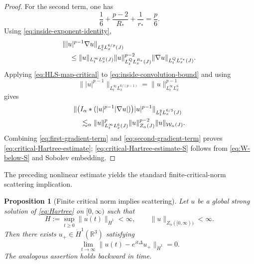 \documentclass[preprint,12pt]{elsarticle}
\numberwithin{equation}{section}
\newtheorem{proposition}[theorem]{Proposition}
\theoremstyle{remark}
\newcommand{\R}{\mathbb R}
\newcommand{\Znorm}{Z_{\alpha}}
\newcommand{\Wnorm}{\mathcal W_{\alpha}}
\begin{document}
\begin{proof}
For the second term, one has
\begin{equation}\label{eq:inside-exponent-identity}
  \frac16+\frac{p-2}{R_*}+\frac1{r_*}=\frac p6.
\end{equation}
Using \eqref{eq:inside-exponent-identity},
\begin{align}
 &\||u|^{p-1}\nabla u\|_{L_t^2L_x^{6/p}(J)}\notag\\
 &\quad\le
 \|u\|_{L_t^\infty L_x^6(J)}
 \|u\|_{L_t^Q L_x^{R_*}(J)}^{p-2}
 \|\nabla u\|_{L_t^Q L_x^{r_*}(J)}.
 \label{eq:inside-convolution-bound}
\end{align}
Applying \eqref{eq:HLS-map-critical} to \eqref{eq:inside-convolution-bound} and using
\begin{equation*}
  \||u|^{p-1}\|_{L_t^\infty L_x^{6/(p-1)}}
  =\|u\|_{L_t^\infty L_x^6}^{p-1}
\end{equation*}
gives
\begin{align}
 &\|\bigl(I_\alpha*(|u|^{p-1}|\nabla u|)\bigr)|u|^{p-1}\|_{L_t^2L_x^{6/5}(J)}\notag\\
 &\quad\lesssim_\alpha
 \|u\|_{L_t^\infty L_x^6(J)}^p
 \|u\|_{\Znorm(J)}^{p-2}
 \|u\|_{\Wnorm(J)}.
 \label{eq:second-gradient-term}
\end{align}
Combining \eqref{eq:first-gradient-term} and \eqref{eq:second-gradient-term} proves \eqref{eq:critical-Hartree-estimate}; \eqref{eq:critical-Hartree-estimate-S} follows from \eqref{eq:W-below-S} and Sobolev embedding.
\end{proof}

The preceding nonlinear estimate yields the standard finite-critical-norm scattering implication.

\begin{proposition}[Finite critical norm implies scattering]\label{prop:finite-Z-scattering}
Let $u$ be a global strong solution of \eqref{eq:Hartree} on $[0,\infty)$ such that
\begin{equation}\label{eq:finite-Z-hypotheses}
  H:=\sup_{t\ge0}\|u(t)\|_{\dot H^1}<\infty,
  \qquad
  \|u\|_{\Znorm([0,\infty))}<\infty.
\end{equation}
Then there exists $u_+\in\dot H^1(\R^3)$ satisfying
\begin{equation}\label{eq:forward-scattering}
  \lim_{t\to\infty}
  \|u(t)-e^{it\Delta}u_+\|_{\dot H^1}=0.
\end{equation}
The analogous assertion holds backward in time.
\end{proposition}
\end{document}
